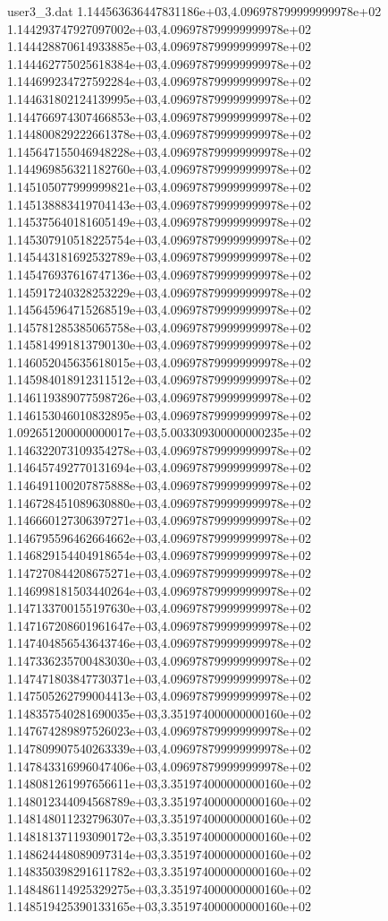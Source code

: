\begin{filecontents}{user3_3.dat}
1.144563636447831186e+03,4.096978799999999978e+02
1.144293747927097002e+03,4.096978799999999978e+02
1.144428870614933885e+03,4.096978799999999978e+02
1.144462775025618384e+03,4.096978799999999978e+02
1.144699234727592284e+03,4.096978799999999978e+02
1.144631802124139995e+03,4.096978799999999978e+02
1.144766974307466853e+03,4.096978799999999978e+02
1.144800829222661378e+03,4.096978799999999978e+02
1.145647155046948228e+03,4.096978799999999978e+02
1.144969856321182760e+03,4.096978799999999978e+02
1.145105077999999821e+03,4.096978799999999978e+02
1.145138883419704143e+03,4.096978799999999978e+02
1.145375640181605149e+03,4.096978799999999978e+02
1.145307910518225754e+03,4.096978799999999978e+02
1.145443181692532789e+03,4.096978799999999978e+02
1.145476937616747136e+03,4.096978799999999978e+02
1.145917240328253229e+03,4.096978799999999978e+02
1.145645964715268519e+03,4.096978799999999978e+02
1.145781285385065758e+03,4.096978799999999978e+02
1.145814991813790130e+03,4.096978799999999978e+02
1.146052045635618015e+03,4.096978799999999978e+02
1.145984018912311512e+03,4.096978799999999978e+02
1.146119389077598726e+03,4.096978799999999978e+02
1.146153046010832895e+03,4.096978799999999978e+02
1.092651200000000017e+03,5.003309300000000235e+02
1.146322073109354278e+03,4.096978799999999978e+02
1.146457492770131694e+03,4.096978799999999978e+02
1.146491100207875888e+03,4.096978799999999978e+02
1.146728451089630880e+03,4.096978799999999978e+02
1.146660127306397271e+03,4.096978799999999978e+02
1.146795596462664662e+03,4.096978799999999978e+02
1.146829154404918654e+03,4.096978799999999978e+02
1.147270844208675271e+03,4.096978799999999978e+02
1.146998181503440264e+03,4.096978799999999978e+02
1.147133700155197630e+03,4.096978799999999978e+02
1.147167208601961647e+03,4.096978799999999978e+02
1.147404856543643746e+03,4.096978799999999978e+02
1.147336235700483030e+03,4.096978799999999978e+02
1.147471803847730371e+03,4.096978799999999978e+02
1.147505262799004413e+03,4.096978799999999978e+02
1.148357540281690035e+03,3.351974000000000160e+02
1.147674289897526023e+03,4.096978799999999978e+02
1.147809907540263339e+03,4.096978799999999978e+02
1.147843316996047406e+03,4.096978799999999978e+02
1.148081261997656611e+03,3.351974000000000160e+02
1.148012344094568789e+03,3.351974000000000160e+02
1.148148011232796307e+03,3.351974000000000160e+02
1.148181371193090172e+03,3.351974000000000160e+02
1.148624448089097314e+03,3.351974000000000160e+02
1.148350398291611782e+03,3.351974000000000160e+02
1.148486114925329275e+03,3.351974000000000160e+02
1.148519425390133165e+03,3.351974000000000160e+02

\end{filecontents}
